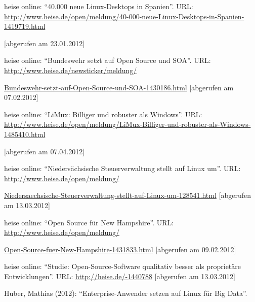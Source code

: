 \documentclass[a4paper]{scrartcl}
\begin{document}
{
{{heise online:
``}}{{40.000}}{{
}}{{neue}}{{
}}{{Linux-Desktops}}{{
}}{{in}}{{
}}{{Spanien}}{{''}}{{.
URL:
}}\url{http://www.heise.de/open/meldung/40-000-neue-Linux-Desktops-in-Spanien-1419719.html}}

{
{{[abgerufen am 23.01.2012]}}}

{
{{heise online:
``}}{{Bundeswehr}}{{
}}{{setzt}}{{
}}{{auf}}{{
}}{{Open}}{{
}}{{Source}}{{
}}{{und}}{{
}}{{SOA}}{{''}}{{.
URL:
}}\href{http://www.heise.de/newsticker/meldung/Bundeswehr-setzt-auf-Open-Source-und-SOA-1430186.html}{{http://www.heise.de/newsticker/meldung/}}}

{
\href{http://www.heise.de/newsticker/meldung/Bundeswehr-setzt-auf-Open-Source-und-SOA-1430186.html}{{Bundeswehr-setzt-auf-Open-Source-und-SOA-1430186.html}}{{
}}{{[abgerufen am
07.02.2012]}}}

{
{{heise online:
``}}{{LiMux:}}{{
}}{{Billiger}}{{
}}{{und}}{{
}}{{robuster}}{{
}}{{als}}{{
}}{{Windows}}{{''}}{{.
URL:
}}\url{http://www.heise.de/open/meldung/LiMux-Billiger-und-robuster-als-Windows-1485410.html}}

{
{{[abgerufen am 07.04.2012]}}}

{
{{heise online:
``Niedersächsische Steuerverwaltung stellt auf Linux
um''. URL:
}}\href{http://www.heise.de/open/meldung/Niedersaechsische-Steuerverwaltung-stellt-auf-Linux-um-128541.html}{{http://www.heise.de/open/meldung/}}}

{
\href{http://www.heise.de/open/meldung/Niedersaechsische-Steuerverwaltung-stellt-auf-Linux-um-128541.html}{{Niedersaechsische-Steuerverwaltung-stellt-auf-Linux-um-128541.html}}{{
}}{[abgerufen am
}{{13.03.2012]}}}

{
{{heise online:
``}}{{Open}}{{
}}{{Source}}{{
}}{{für}}{{
}}{{New}}{{
}}{{Hampshire}}{{''}}{{.
URL:
}}\href{http://www.heise.de/open/meldung/Open-Source-fuer-New-Hampshire-1431833.html}{{http://www.heise.de/open/meldung/}}}

{
\href{http://www.heise.de/open/meldung/Open-Source-fuer-New-Hampshire-1431833.html}{{Open-Source-fuer-New-Hampshire-1431833.html}}{{
[abgerufen am 09.02.2012]}}}

{
{{heise online:
``Studie: Open-Source-Software qualitativ besser als
proprietäre Entwicklungen''. URL:
}}\url{http://heise.de/-1440788}{{
}}{{[abgerufen am
}}{{13.03.2012]}}}

{
{{Huber, Mathias (2012):
``}}{{Enterprise-Anwender}}{{
}}{{setzen}}{{
}}{{auf}}{{
}}{{Linux}}{{
}}{{für}}{{
}}{{Big}}{{
}}{{Data}}{{''.}}{{
}}}
\end{document}
